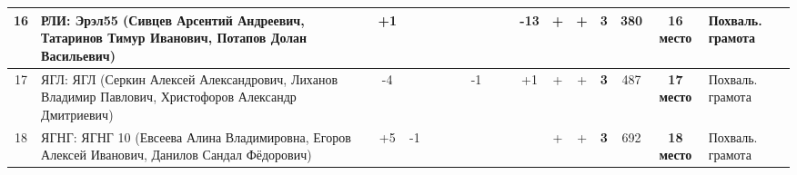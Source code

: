 \begin{center}
\begin{tabular}{|c|p{6cm}|c|c|c|c|c|c|c|c|c|c|c|c|c|c|c|>{\centering\arraybackslash}p{1.2cm}|}
16 & РЛИ: Эрэл55 (Сивцев Арсентий Андреевич, Татаринов Тимур Иванович, Потапов Долан Васильевич)
&    & +1 &    &    &    &    &    &    &    & -13& +  & +  & \bf{3} & 380  & \bf{16 место} & Похваль. грамота \\
\hline

17 & ЯГЛ: ЯГЛ (Серкин Алексей Александрович, Лиханов Владимир Павлович, Христофоров Александр Дмитриевич)
&    & -4 &    &    &    &    & -1 &    &    & +1 & +  & +  & \bf{3} & 487  & \bf{17 место} & Похваль. грамота \\
\hline

18 & ЯГНГ: ЯГНГ 10 (Евсеева Алина Владимировна, Егоров Алексей Иванович, Данилов Сандал Фёдорович)
& \hspace{2.8mm} & +5 & -1 & \hspace{2.8mm} & \hspace{2.8mm} & \hspace{2.8mm} &    &    & \hspace{3mm} &    & +  & +  & \bf{3} & 692  & \bf{18 место} & Похваль. грамота \\
\hline



\end{tabular}
\end{center}
